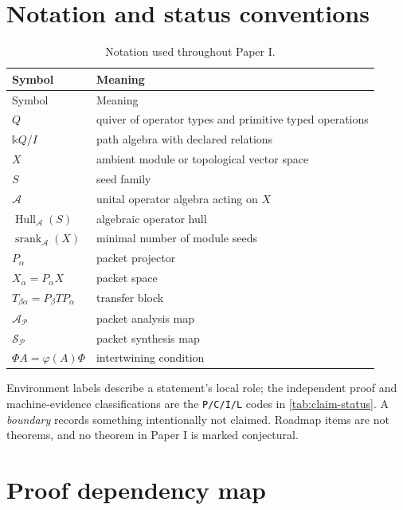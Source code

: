 \documentclass[11pt]{article}
\theoremstyle{definition}
\theoremstyle{remark}
\newcommand{\cA}{\mathcal A}
\newcommand{\cP}{\mathcal P}
\newcommand{\Hull}{\operatorname{Hull}}
\newcommand{\srank}{\operatorname{srank}}
\newcommand{\bbk}{\mathbb{k}}
\begin{document}
\appendix

\section{Notation and status conventions}

\begin{longtable}{L{0.21\textwidth}L{0.70\textwidth}}
\caption{Notation used throughout Paper I.}\label{tab:notation}\\
\toprule
Symbol & Meaning \\
\midrule
\endfirsthead
\toprule
Symbol & Meaning \\
\midrule
\endhead
$Q$ & quiver of operator types and primitive typed operations \\
$\bbk Q/I$ & path algebra with declared relations \\
$X$ & ambient module or topological vector space \\
$S$ & seed family \\
$\cA$ & unital operator algebra acting on $X$ \\
$\Hull_{\cA}(S)$ & algebraic operator hull \\
$\srank_{\cA}(X)$ & minimal number of module seeds \\
$P_{\alpha}$ & packet projector \\
$X_{\alpha}=P_{\alpha}X$ & packet space \\
$T_{\beta\alpha}=P_{\beta}TP_{\alpha}$ & transfer block \\
$\mathcal A_{\cP}$ & packet analysis map \\
$\mathcal S_{\cP}$ & packet synthesis map \\
$\Phi A=\varphi(A)\Phi$ & intertwining condition \\
\bottomrule
\end{longtable}

Environment labels describe a statement's local role; the independent proof and machine-evidence classifications are the \texttt{P/C/I/L} codes in \cref{tab:claim-status}. A \emph{boundary} records something intentionally not claimed. Roadmap items are not theorems, and no theorem in Paper I is marked conjectural.

\section{Proof dependency map}
\end{document}
